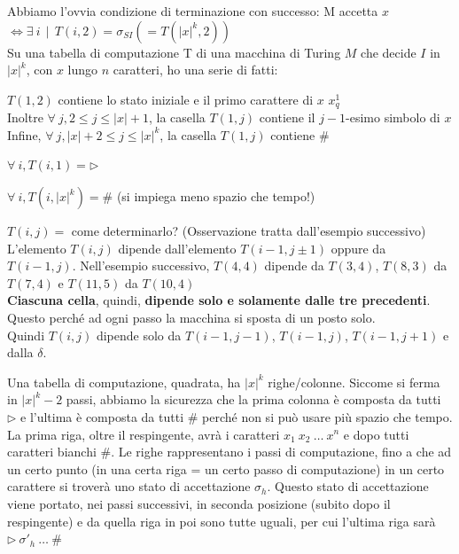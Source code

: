 \documentclass[10pt]{book}
\begin{document}
Abbiamo l'ovvia condizione di terminazione con successo: M accetta $x$ $\Leftrightarrow \exists\:i\:\:|\:\:T(i, 2) = \sigma_{SI} (= T(|x|^k, 2))$\\
Su una tabella di computazione T di una macchina di Turing $M$ che decide $I$ in $|x|^k$, con $x$ lungo $n$ caratteri, ho una serie di fatti:
\begin{list}{}{}
	\item $T(1, 2)$ contiene lo stato iniziale e il primo carattere di $x$ $x_q^1$\\
	Inoltre $\forall\:j, 2\leq j \leq |x| + 1$, la casella $T(1, j)$ contiene il $j - 1$-esimo simbolo di $x$\\
	Infine, $\forall\:j, |x| + 2 \leq j \leq |x|^k$, la casella $T(1, j)$ contiene $\#$
	\item $\forall\:i, T(i, 1) = \triangleright$
	\item $\forall\:i, T(i, |x|^k) = \#$ (si impiega meno spazio che tempo!)
	\item $T(i, j) = $ come determinarlo? (Osservazione tratta dall'esempio successivo)\\
	L'elemento $T(i, j)$ dipende dall'elemento $T(i-1, j\pm1)$ oppure da $T(i-1, j)$. Nell'esempio successivo, $T(4, 4)$ dipende da $T(3, 4)$, $T(8, 3)$ da $T(7, 4)$ e $T(11, 5)$ da $T(10, 4)$\\
	\textbf{Ciascuna cella}, quindi, \textbf{dipende solo e solamente dalle tre precedenti}. Questo perché ad ogni passo la macchina si sposta di un posto solo.\\
	Quindi $T(i, j)$ dipende solo da $T(i-1, j-1)$, $T(i-1, j)$, $T(i-1, j+1)$ e dalla $\delta$.
\end{list}
Una tabella di computazione, quadrata, ha $|x|^k$ righe/colonne. Siccome si ferma in $|x|^k - 2$ passi, abbiamo la sicurezza che la prima colonna è composta da tutti $\triangleright$ e l'ultima è composta da tutti $\#$ perché non si può usare più spazio che tempo.\\
La prima riga, oltre il respingente, avrà i caratteri $x_1\:x_2\:\ldots\:x^n$ e dopo tutti caratteri bianchi $\#$. Le righe rappresentano i passi di computazione, fino a che ad un certo punto (in una certa riga = un certo passo di computazione) in un certo carattere si troverà uno stato di accettazione $\sigma_h$. Questo stato di accettazione viene portato, nei passi successivi, in seconda posizione (subito dopo il respingente) e da quella riga in poi sono tutte uguali, per cui l'ultima riga sarà $\triangleright\:\sigma'_h\:\ldots\:\#$
\end{document}
